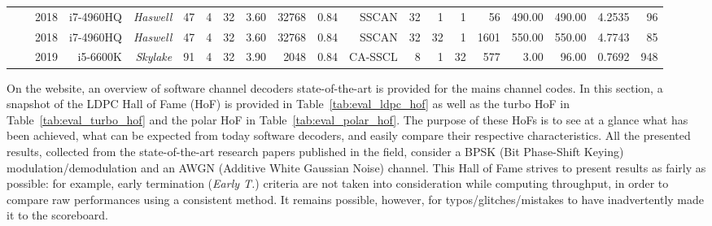 \begin{table}[htp]
\begin{adjustbox}{angle=90}
{{\begin{tabular}{|r|r r|r r r r r r|r r|r r r r|r r|r r r|}
                                                                 & \cite{LeGal2017a}    & 2018          & i7-4960HQ          & \textit{Haswell}   &          47  & {\color{Paired-1}4} &  32           & 3.60           & 32768    & 0.84     &      SSCAN         & 32            &                     1  &  1                &                      56  &                   490.00  &  490.00       &  4.2535        &     96             \\
                                                                 & \cite{LeGal2017a}    & 2018          & i7-4960HQ          & \textit{Haswell}   &          47  & {\color{Paired-1}4} &  32           & 3.60           & 32768    & 0.84     &      SSCAN         & 32            &                    32  &  1                &                    1601  &                   550.00  &  550.00       &  4.7743        &     85             \\
                                                                 & \cite{Leonardon2019} & 2019          & i5-6600K           & \textit{Skylake}   &          91  & {\color{Paired-1}4} &  32           & 3.90           &  2048    & 0.84     &   CA-SSCL          &  8            &                     1  & 32                &                     577  &                     3.00  &   96.00       &  0.7692        &    948             \\

  \hline
  \end{tabular}
  }}
  \end{adjustbox}
\end{table}

On the \AFFECT website, an overview of software channel decoders
state-of-the-art is provided for the mains channel codes. In this section, a
snapshot of the LDPC Hall of Fame (HoF) is provided in
Table~\ref{tab:eval_ldpc_hof} as well as the turbo HoF in
Table~\ref{tab:eval_turbo_hof} and the polar HoF in
Table~\ref{tab:eval_polar_hof}. The purpose of these HoFs is to see at a glance
what has been achieved, what can be expected from today software decoders, and
easily compare their respective characteristics. All the presented results,
collected from the state-of-the-art research papers published in the field,
consider a BPSK (Bit Phase-Shift Keying) modulation/demodulation and an AWGN
(Additive White Gaussian Noise) channel. This Hall of Fame strives to present
results as fairly as possible: for example, early termination (\emph{Early T.})
criteria are not taken into consideration while computing throughput, in order
to compare raw performances using a consistent method. It remains possible,
however, for typos/glitches/mistakes to have inadvertently made it to the
scoreboard.


